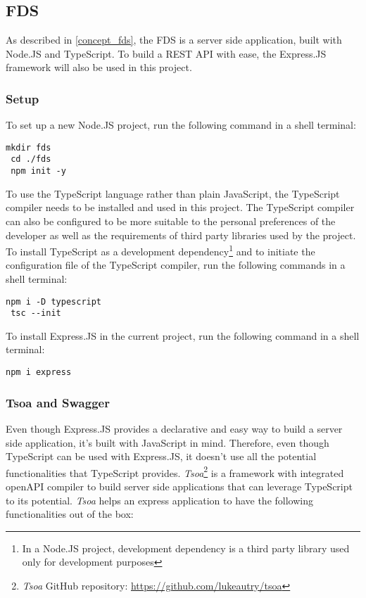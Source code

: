  \subsection{FDS}
 As described in \autoref{concept_fds}, the FDS is a server side application, built with Node.JS and TypeScript. To build a REST API with ease, the Express.JS framework will also be used in this project. 

  \subsubsection{Setup}
  To set up a new Node.JS project, run the following command in a shell terminal:

   \begin{lstlisting}[caption={Creating a new Node.JS program (Shell)}]
 mkdir fds
 cd ./fds
 npm init -y
   \end{lstlisting}
   
  To use the TypeScript language rather than plain JavaScript, the TypeScript compiler needs to be installed and used in this project. The TypeScript compiler can also be configured to be more suitable to the personal preferences of the developer as well as the requirements of third party libraries used by the project. To install TypeScript as a development dependency\footnote{In a Node.JS project, development dependency is a third party library used only for development purposes} and to initiate the configuration file of the TypeScript compiler, run the following commands in a shell terminal:
  
   \begin{lstlisting}[caption={Installing and configuring TypeScript compiler (Shell)}]
 npm i -D typescript
 tsc --init
   \end{lstlisting}
  
  To install Express.JS in the current project, run the following command in a shell terminal:
  
   \begin{lstlisting}[caption={Installing Express.JS (Shell)}]
 npm i express
   \end{lstlisting}
  
  \subsubsection{Tsoa and Swagger}
  Even though Express.JS provides a declarative and easy way to build a server side application, it's built with JavaScript in mind. Therefore, even though TypeScript can be used with Express.JS, it doesn't use all the potential functionalities that TypeScript provides. \emph{Tsoa}\footnote{\emph{Tsoa} GitHub repository: \url{https://github.com/lukeautry/tsoa}} is a framework with integrated openAPI compiler to build server side applications that can leverage TypeScript to its potential. \emph{Tsoa} helps an express application to have the following functionalities out of the box:

